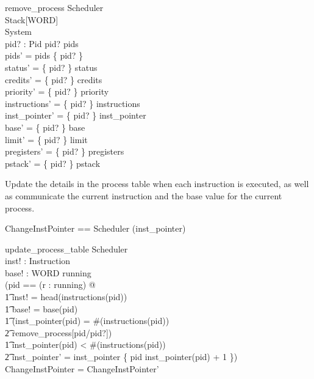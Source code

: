 \begin{schema}{remove\_process}
    \Delta Scheduler\\
    \Xi Stack[WORD]\\
    \Xi System\\
    pid? : Pid
\where
    pid? \in pids\\
    pids' = pids \setminus \{ pid? \}\\
    status' = \{ pid? \} \ndres status\\
    credits' = \{ pid? \} \ndres credits\\
    priority' = \{ pid? \} \ndres priority\\
    instructions' = \{ pid? \} \ndres instructions\\
    inst\_pointer' = \{ pid? \} \ndres inst\_pointer\\
    base'  = \{ pid? \} \ndres base\\
    limit'  = \{ pid? \} \ndres limit\\
    pregisters' = \{ pid? \} \ndres pregisters\\
    pstack' = \{ pid? \} \ndres pstack
\end{schema}

Update the details in the process table when each instruction is
executed, as well as communicate the current instruction and the base
value for the current process.

\begin{syntax}
    ChangeInstPointer == Scheduler \hide (inst\_pointer)
\end{syntax}

\begin{schema}{update\_process\_table}
    \Delta Scheduler\\
    inst! : Instruction\\
    base! : WORD
\where
    running \neq \emptyset\\
    (\LET pid == (\mu r : running) @\\
	\t1 inst! = head(instructions(pid)) \land\\
	\t1 base! = base(pid) \land\\
	\t1 (inst\_pointer(pid) = \#(instructions(pid)) \implies\\
            \t2 remove\_process[pid/pid?]) \land\\
	\t1 inst\_pointer(pid) < \#(instructions(pid)) \implies\\
	    \t2 inst\_pointer' = inst\_pointer \oplus \{ pid \mapsto inst\_pointer(pid) + 1 \})\\
     \theta ChangeInstPointer = \theta ChangeInstPointer'
\end{schema}


